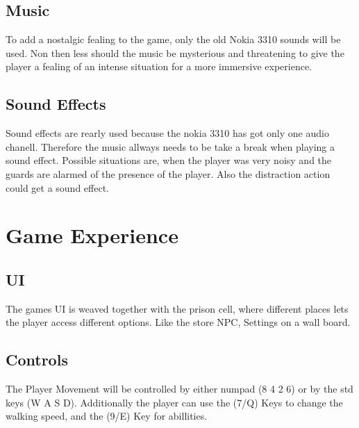 \documentclass[12pt, a4paper]{article}
\begin{document}
{        \subsection{Music}
            To add a nostalgic fealing to the game, only the old Nokia 3310
            sounds will be used. Non then less should the music be mysterious
            and threatening to give the player a fealing of an intense 
            situation for a more immersive experience.

        \subsection{Sound Effects}
            Sound effects are rearly used because the nokia 3310
            has got only one audio chanell. Therefore the music 
            allways needs to be take a break when playing a sound
            effect. Possible situations are, when the player was very noisy
            and the guards are alarmed of the presence of the player. Also
            the distraction action could get a sound effect.

    \section{Game Experience}
    
        \subsection{UI}
            The games UI is weaved together with the prison cell,
            where different places lets the player access different
            options. Like the store NPC, Settings on a wall board.
            
        \subsection{Controls}
            The Player Movement will be controlled by either numpad (8 4 2 6)
            or by the std keys (W A S D). Additionally the player can use the (7/Q)
            Keys to change the walking speed, and the (9/E) Key for abillities.

}
\end{document}
